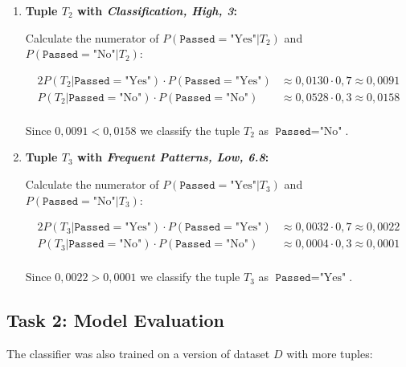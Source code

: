 \documentclass[
english,
smallborders
]{i6prcsht}
\newcommand{\BayesNumerator}[3]{P(#1 | \texttt{#2}=\text{"#3"}) \cdot P(\texttt{#2}=\text{"#3"})}
\newcommand{\PosterioriProbability}[3]{P(\texttt{#2}=\text{"#3"} | #1)}
\newcommand{\ResultClass}[2]{\texttt{#1}=\text{"#2"}}
\begin{document}
\begin{solution}
\begin{enumerate}
\begin{enumerate}
			            \newpage
			            
			      \item \textbf{Tuple $T_2$ with \textit{Classification, High, 3}:}
			            
			            Calculate the numerator of $\PosterioriProbability{T_2}{Passed}{Yes}$ and $\PosterioriProbability{T_2}{Passed}{No}$:
			            
			            \begin{alignat*}{2}
				            \BayesNumerator{T_2}{Passed}{Yes} & \approx 0,0130 \cdot 0,7 \approx 0,0091 \\
				            \BayesNumerator{T_2}{Passed}{No}  & \approx 0,0528 \cdot 0,3 \approx 0,0158 \\
			            \end{alignat*}
			            
			            Since $0,0091 < 0,0158$ we classify the tuple $T_2$ as $\ResultClass{Passed}{No}$.
			            
			      \item \textbf{Tuple $T_3$ with \textit{Frequent Patterns, Low, 6.8}:}
			            
			            Calculate the numerator of $\PosterioriProbability{T_3}{Passed}{Yes}$ and $\PosterioriProbability{T_3}{Passed}{No}$:
			            
			            \begin{alignat*}{2}
				            \BayesNumerator{T_3}{Passed}{Yes} & \approx 0,0032 \cdot 0,7 \approx 0,0022 \\
				            \BayesNumerator{T_3}{Passed}{No}  & \approx 0,0004 \cdot 0,3 \approx 0,0001 \\
			            \end{alignat*}
			            
			            Since $0,0022 > 0,0001$ we classify the tuple $T_3$ as $\ResultClass{Passed}{Yes}$.
		      \end{enumerate}
		      
		      
		      
	\end{enumerate}
\end{solution}

\subsection*{Task 2: Model Evaluation}

The classifier was also trained on a version of dataset $D$ with more tuples:
\end{document}
